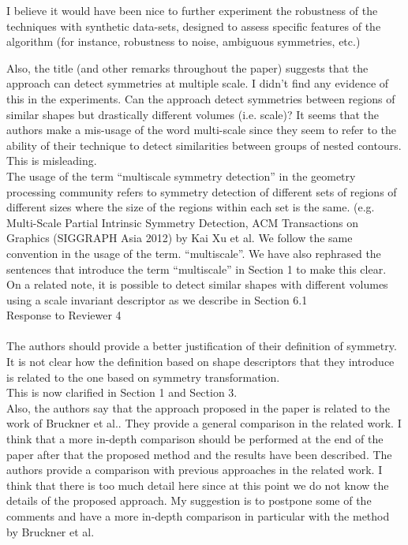 \documentclass[10pt]{article}
\begin{document}
   I believe it would have been nice to further experiment the robustness of
   the techniques with synthetic data-sets, designed to assess specific
   features of the algorithm (for instance, robustness to noise, ambiguous
   symmetries, etc.)

   Also, the title (and other remarks throughout the paper) suggests that
   the approach can detect symmetries at multiple scale. I didn't find any
   evidence of this in the experiments. Can the approach detect symmetries
   between regions of similar shapes but drastically different volumes (i.e.
   scale)?
   It seems that the authors make a mis-usage of the word multi-scale since
   they seem to refer to the ability of their technique to detect
   similarities between groups of nested contours. This is misleading.\\

   {\color{blue}The usage of the term ``multiscale symmetry detection'' in
	   the geometry processing community refers to symmetry detection of
	   different sets of regions of different sizes where the size of the regions
	   within each set is the same. (e.g. Multi-Scale Partial Intrinsic Symmetry Detection,
   ACM Transactions on Graphics (SIGGRAPH Asia 2012) by Kai Xu et al.
   We follow the same convention in the usage of the term. ``multiscale''.
   We have also rephrased the sentences that introduce the term ``multiscale''
   in Section 1 to make this clear. On a related note, it is possible to
   detect similar shapes with different volumes using a scale invariant descriptor
   as we describe in Section 6.1}\\
   

{\noindent \LARGE Response to Reviewer 4}\\\\
   The authors should provide a better justification of their definition of
   symmetry. It is not clear how the definition based on shape descriptors
   that they introduce is related to the one based on symmetry
   transformation. \\

   {\color{blue}This is now clarified in Section 1 and Section 3.}\\

   Also, the authors say that the approach proposed in the paper is related
   to the work of Bruckner et al.. They provide a general comparison in the
   related work. I think that a more in-depth comparison should be performed
   at the end of the paper after that the proposed method and the results
   have been described.
   The authors provide a comparison with previous approaches in the related
   work. I think that there is too much detail here since at this point we
   do not know the details of the proposed approach. My suggestion is to
   postpone some of the comments and have a more in-depth comparison in
   particular with the method by Bruckner et al.
\end{document}
